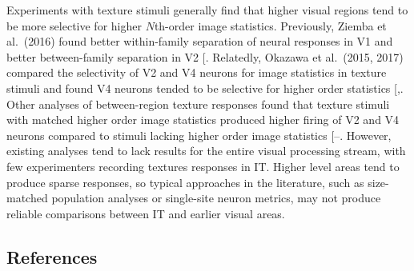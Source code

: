 \documentclass[
  10pt,
  letterpaper,
  DIV=11,
  numbers=noendperiod]{scrartcl}
\begin{document}
Experiments with texture stimuli generally find that higher visual
regions tend to be more selective for higher \(N\)th-order image
statistics. Previously, Ziemba et al.~(2016) found better within-family
separation of neural responses in V1 and better between-family
separation in V2 {[}\citeproc{ref-ziemba_selectivity_2016}{3}{]}.
Relatedly, Okazawa et al.~(2015, 2017) compared the selectivity of V2
and V4 neurons for image statistics in texture stimuli and found V4
neurons tended to be selective for higher order statistics
{[},\citeproc{ref-okazawa_gradual_2017}{5}{]}.
Other analyses of between-region texture responses found that texture
stimuli with matched higher order image statistics produced higher
firing of V2 and V4 neurons compared to stimuli lacking higher order
image statistics
{[}--\citeproc{ref-lee_emergence_2025}{8}{]}.
However, existing analyses tend to lack results for the entire visual
processing stream, with few experimenters recording textures responses
in IT. Higher level areas tend to produce sparse responses, so typical
approaches in the literature, such as size-matched population analyses
or single-site neuron metrics, may not produce reliable comparisons
between IT and earlier visual areas.

\pagebreak

\subsection{References}\label{references}
\end{document}
